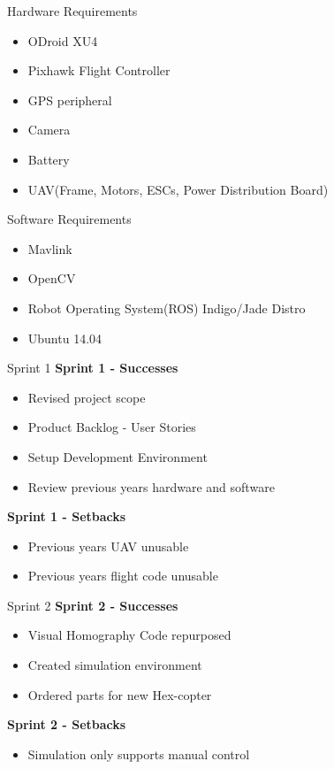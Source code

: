 \documentclass[11pt]{beamer}
\begin{document}
\begin{frame}{Hardware Requirements}
\begin{itemize}
\item ODroid XU4
\item Pixhawk Flight Controller
\item GPS peripheral
\item Camera
\item Battery
\item UAV(Frame, Motors, ESCs, Power Distribution Board)
\end{itemize}

\end{frame}

\begin{frame}{Software Requirements}
\begin{itemize}
\item Mavlink
\item OpenCV
\item Robot Operating System(ROS) Indigo/Jade Distro
\item Ubuntu 14.04
\end{itemize}

\end{frame}


\begin{frame}{Sprint 1}
	\large{\textbf{Sprint 1 - Successes}}
\begin{itemize}
	\item Revised project scope
	\item Product Backlog - User Stories
	\item Setup Development Environment
	\item Review previous years hardware and software
\end{itemize}

	\large{\textbf{Sprint 1 - Setbacks}}
	\begin{itemize}
		\item Previous years UAV unusable
		\item Previous years flight code unusable
	\end{itemize}
\end{frame}


\begin{frame}{Sprint 2}
	\large{\textbf{Sprint 2 - Successes}}
	\begin{itemize}
		\item Visual Homography Code repurposed
		\item Created simulation environment
		\item Ordered parts for new Hex-copter
	\end{itemize}
	\large{\textbf{Sprint 2 - Setbacks}}
	\begin{itemize}
		\item Simulation only supports manual control
	\end{itemize}
\end{frame}
\end{document}
